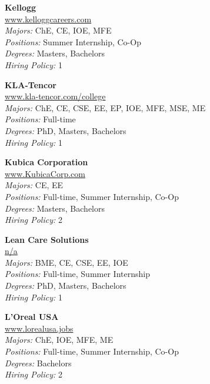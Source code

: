 \documentclass{article}
\begin{document}
\begin{center}
\begin{multicols}{3}
\begin{minipage}{.9\columnwidth}{\Large\bf Kellogg }\\
	\url{www.kelloggcareers.com}\\
	\emph{Majors:} ChE, CE, IOE, MFE\\
	\emph{Positions:} Summer Internship, Co-Op\\
	\emph{Degrees:} Masters, Bachelors\\
	\emph{Hiring Policy:} 1\\
\end{minipage}
 
\begin{minipage}{.9\columnwidth}{\Large\bf KLA-Tencor }\\
	\url{www.kla-tencor.com/college}\\
	\emph{Majors:} ChE, CE, CSE, EE, EP, IOE, MFE, MSE, ME\\
	\emph{Positions:} Full-time\\
	\emph{Degrees:} PhD, Masters, Bachelors\\
	\emph{Hiring Policy:} 1\\
\end{minipage}
 
\begin{minipage}{.9\columnwidth}{\Large\bf Kubica Corporation }\\
	\url{www.KubicaCorp.com}\\
	\emph{Majors:} CE, EE\\
	\emph{Positions:} Full-time, Summer Internship, Co-Op\\
	\emph{Degrees:} Masters, Bachelors\\
	\emph{Hiring Policy:} 2\\
\end{minipage}
 
\begin{minipage}{.9\columnwidth}{\Large\bf Lean Care Solutions }\\
	\url{n/a}\\
	\emph{Majors:} BME, CE, CSE, EE, IOE\\
	\emph{Positions:} Full-time, Summer Internship\\
	\emph{Degrees:} PhD, Masters, Bachelors\\
	\emph{Hiring Policy:} 1\\
\end{minipage}
 
\begin{minipage}{.9\columnwidth}{\Large\bf L'Oreal USA }\\
	\url{www.lorealusa.jobs}\\
	\emph{Majors:} ChE, IOE, MFE, ME\\
	\emph{Positions:} Full-time, Summer Internship, Co-Op\\
	\emph{Degrees:} Bachelors\\
	\emph{Hiring Policy:} 2\\
\end{minipage}
 

\end{multicols}
\end{center}
\end{document}
